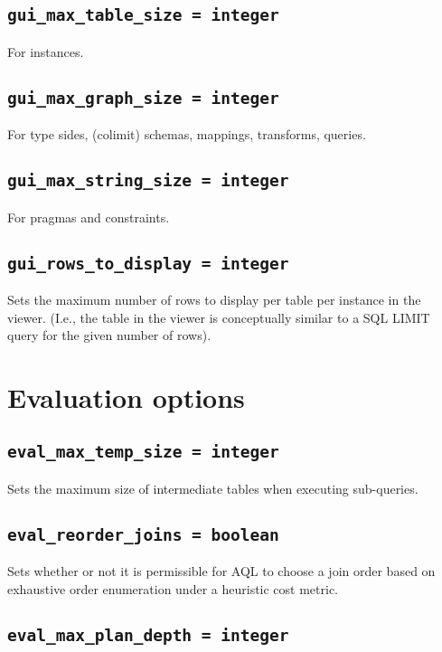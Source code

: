 \documentclass[10pt]{book}
\begin{document}
\subsection{{\tt gui\_max\_table\_size = integer}}

For instances.

\subsection{{\tt gui\_max\_graph\_size = integer}}

For type sides, (colimit) schemas, mappings, transforms, queries.

\subsection{{\tt gui\_max\_string\_size = integer}}

For pragmas and constraints.

\subsection{{\tt gui\_rows\_to\_display = integer}}

Sets the maximum number of rows to display per table per instance in the viewer.  (I.e., the table in the viewer is conceptually similar to a SQL LIMIT query for the given number of rows).

\section{Evaluation options}

\subsection{{\tt eval\_max\_temp\_size = integer}}

Sets the maximum size of intermediate tables when executing sub-queries.

\subsection{{\tt eval\_reorder\_joins = boolean}}

Sets whether or not it is permissible for AQL to choose a join order based on exhaustive order enumeration under a heuristic cost metric.

\subsection{{\tt eval\_max\_plan\_depth = integer}}
\end{document}
